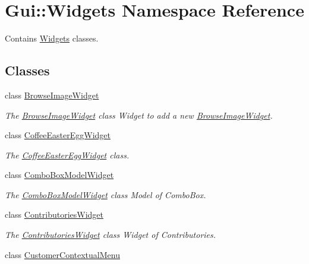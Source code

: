 \hypertarget{namespaceGui_1_1Widgets}{\section{Gui\-:\-:Widgets Namespace Reference}
\label{namespaceGui_1_1Widgets}
}


Contains \hyperlink{namespaceGui_1_1Widgets}{Widgets} classes.  


\subsection*{Classes}
\begin{DoxyCompactItemize}
\item 
class \hyperlink{classGui_1_1Widgets_1_1BrowseImageWidget}{Browse\-Image\-Widget}
\begin{DoxyCompactList}\small\item\em The \hyperlink{classGui_1_1Widgets_1_1BrowseImageWidget}{Browse\-Image\-Widget} class Widget to add a new \hyperlink{classGui_1_1Widgets_1_1BrowseImageWidget}{Browse\-Image\-Widget}. \end{DoxyCompactList}\item 
class \hyperlink{classGui_1_1Widgets_1_1CoffeeEasterEggWidget}{Coffee\-Easter\-Egg\-Widget}
\begin{DoxyCompactList}\small\item\em The \hyperlink{classGui_1_1Widgets_1_1CoffeeEasterEggWidget}{Coffee\-Easter\-Egg\-Widget} class. \end{DoxyCompactList}\item 
class \hyperlink{classGui_1_1Widgets_1_1ComboBoxModelWidget}{Combo\-Box\-Model\-Widget}
\begin{DoxyCompactList}\small\item\em The \hyperlink{classGui_1_1Widgets_1_1ComboBoxModelWidget}{Combo\-Box\-Model\-Widget} class Model of Combo\-Box. \end{DoxyCompactList}\item 
class \hyperlink{classGui_1_1Widgets_1_1ContributoriesWidget}{Contributories\-Widget}
\begin{DoxyCompactList}\small\item\em The \hyperlink{classGui_1_1Widgets_1_1ContributoriesWidget}{Contributories\-Widget} class Widget of Contributories. \end{DoxyCompactList}\item 
class \hyperlink{classGui_1_1Widgets_1_1CustomerContextualMenu}{Customer\-Contextual\-Menu}

\end{DoxyCompactItemize}
